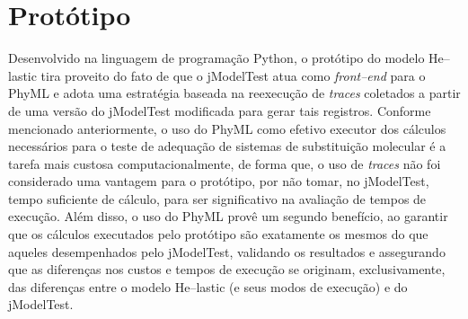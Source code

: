\documentclass[english,brazilian]{UNISINOSmonografia} %
\begin{document}
%














\section{Protótipo}


Desenvolvido na linguagem de programação Python, o protótipo do modelo \textsf{He}--lastic tira proveito do fato de que o jModelTest atua como \textit{front--end} para o PhyML e adota uma estratégia baseada na reexecução de \textit{traces} coletados a partir de uma versão do jModelTest modificada para gerar tais registros.
%
Conforme mencionado anteriormente, o uso do PhyML como efetivo executor dos cálculos necessários para o teste de adequação de sistemas de substituição molecular é a tarefa mais custosa computacionalmente, de forma que, o uso de \textit{traces} não foi considerado uma vantagem para o protótipo, por não tomar, no jModelTest, tempo suficiente de cálculo, para ser significativo na avaliação de tempos de execução.
%
Além disso, o uso do PhyML provê um segundo benefício, ao garantir que os cálculos executados pelo protótipo são exatamente os mesmos do que aqueles desempenhados pelo jModelTest, validando os resultados e assegurando que as diferenças nos custos e tempos de execução se originam, exclusivamente, das diferenças entre o modelo \textsf{He}--lastic (e seus modos de execução) e do jModelTest.





\end{document}
